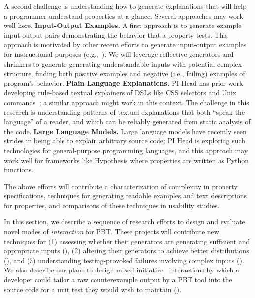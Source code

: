 A second challenge is understanding how to generate explanations that will help 
a programmer understand properties at-a-glance. Several approaches may work well
here.
{\bf Input-Output Examples.} A first approach is to generate 
example input-output pairs demonstrating the behavior that a property tests.  
This approach is motivated by other recent efforts to generate input-output 
examples for instructional
purposes (e.g.,~\cite{ref:gerdes2018understanding,ref:dantoni2015can}). 
We will leverage reflective generators and shrinkers to generate
generating understandable inputs with potential complex structure, finding 
both positive examples and negative (i.e., failing) examples of program's behavior.  
{\bf Plain Language Explanations.} PI Head has prior work developing rule-based textual explainers of 
DSLs like CSS selectors and Unix commands~\cite{ref:head2015tutorons}; a similar 
approach might work in this context.
The challenge in this research is understanding 
patterns of textual explanations that both ``speak the language'' of a reader, 
and which can be reliably generated from static analysis of the code.
{\bf Large Language Models.} Large language models have recently 
seen strides in being able to explain arbitrary source code; PI Head is 
exploring such technologies for general-purpose programming languages, and this 
approach may work well for frameworks like Hypothesis where properties are 
written as Python functions.

The above efforts will contribute
a characterization of complexity in property specifications, 
techniques for generating readable examples and text descriptions for 
properties, and comparisons of these techniques in
usability studies.


In this section, we
describe a sequence of research efforts to design and evaluate novel modes of
{\em interaction} for PBT. These projects will contribute new
techniques for (1) assessing whether their generators are generating
sufficient and
appropriate inputs (), (2)
altering their generators to achieve better distributions
(),
and (3) understanding testing-provoked failures involving complex inputs
().
%
We also describe our plans to design mixed-initiative~\cite{ref:allen1999mixed} 
interactions by which a developer could tailor a raw counterexample output by a 
PBT tool into the source code for a unit test they would wish to maintain
().
%

